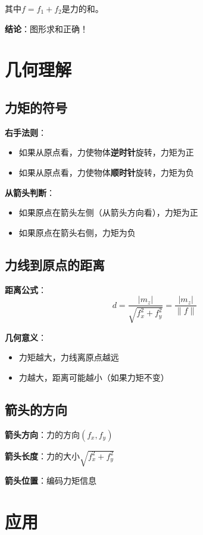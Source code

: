\documentclass[12pt,a4paper]{article}
\begin{document}
其中$f = f_1 + f_2$是力的和。

\textbf{结论}：图形求和正确！

\section{几何理解}

\subsection{力矩的符号}

\textbf{右手法则}：
\begin{itemize}
\item 如果从原点看，力使物体\textbf{逆时针}旋转，力矩为正
\item 如果从原点看，力使物体\textbf{顺时针}旋转，力矩为负
\end{itemize}

\textbf{从箭头判断}：
\begin{itemize}
\item 如果原点在箭头左侧（从箭头方向看），力矩为正
\item 如果原点在箭头右侧，力矩为负
\end{itemize}

\subsection{力线到原点的距离}

\textbf{距离公式}：
\begin{equation}
d = \frac{|m_z|}{\sqrt{f_x^2 + f_y^2}} = \frac{|m_z|}{\|f\|}
\end{equation}

\textbf{几何意义}：
\begin{itemize}
\item 力矩越大，力线离原点越远
\item 力越大，距离可能越小（如果力矩不变）
\end{itemize}

\subsection{箭头的方向}

\textbf{箭头方向}：力的方向$(f_x, f_y)$

\textbf{箭头长度}：力的大小$\sqrt{f_x^2 + f_y^2}$

\textbf{箭头位置}：编码力矩信息

\section{应用}
\end{document}
